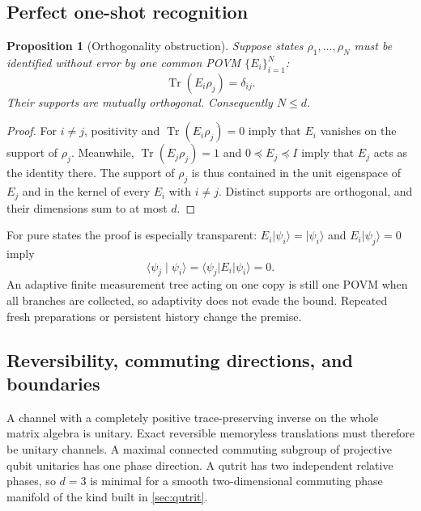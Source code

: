 \documentclass[11pt]{article}
\newtheorem{proposition}[theorem]{Proposition}
\theoremstyle{definition}
\theoremstyle{remark}
\newcommand{\Tr}{\operatorname{Tr}}
\newcommand{\ket}[1]{\lvert #1\rangle}
\newcommand{\bra}[1]{\langle #1\rvert}
\newcommand{\braket}[2]{\langle #1\mid #2\rangle}
\begin{document}
\subsection{Perfect one-shot recognition}

\begin{proposition}[Orthogonality obstruction]
\label{prop:orthogonality}
Suppose states $\rho_1,\ldots,\rho_N$ must be identified without error by one
common POVM $\{E_i\}_{i=1}^N$:
\begin{equation}
  \Tr(E_i\rho_j)=\delta_{ij}.
  \label{eq:perfect-discrimination}
\end{equation}
Their supports are mutually orthogonal. Consequently $N\le d$.
\end{proposition}

\begin{proof}
For $i\ne j$, positivity and $\Tr(E_i\rho_j)=0$ imply that $E_i$ vanishes on
the support of $\rho_j$. Meanwhile,
$\Tr(E_j\rho_j)=1$ and $0\preceq E_j\preceq I$ imply that $E_j$ acts as the
identity there. The support of $\rho_j$ is thus contained in the unit
eigenspace of $E_j$ and in the kernel of every $E_i$ with $i\ne j$. Distinct
supports are orthogonal, and their dimensions sum to at most $d$.
\end{proof}

For pure states the proof is especially transparent:
$E_i\ket{\psi_i}=\ket{\psi_i}$ and
$E_i\ket{\psi_j}=0$ imply
\begin{equation}
 \braket{\psi_j}{\psi_i}
 =\bra{\psi_j}E_i\ket{\psi_i}=0.
\end{equation}
An adaptive finite measurement tree acting on one copy is still one POVM when
all branches are collected, so adaptivity does not evade the bound. Repeated
fresh preparations or persistent history change the premise.

\subsection{Reversibility, commuting directions, and boundaries}

A channel with a completely positive trace-preserving inverse on the whole
matrix algebra is unitary. Exact reversible memoryless translations must
therefore be unitary channels. A maximal connected commuting subgroup of
projective qubit unitaries has one phase direction. A qutrit has two independent
relative phases, so $d=3$ is minimal for a smooth two-dimensional commuting
phase manifold of the kind built in \cref{sec:qutrit}.
\end{document}

